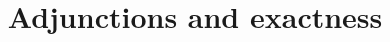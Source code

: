 \documentclass{ximera}
\title{Adjunctions and exactness}
\begin{document}
\begin{abstract}

\end{abstract}
\maketitle

\end{document}
